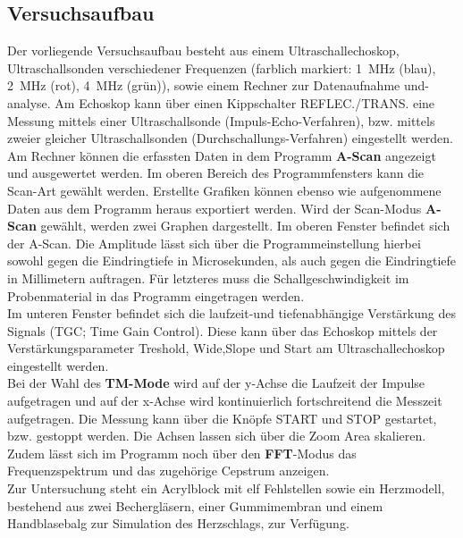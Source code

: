 \subsection{Versuchsaufbau}
\label{sec:Versuchsaufbau}
Der vorliegende Versuchsaufbau besteht aus einem Ultraschallechoskop, Ultraschallsonden verschiedener Frequenzen (farblich markiert: \SI{1}{\mega\Hz} (blau),  \SI{2}{\mega\Hz} (rot),  \SI{4}{\mega\Hz} (grün)), sowie einem Rechner zur Datenaufnahme und-analyse.
Am Echoskop kann über einen Kippschalter REFLEC./TRANS. eine Messung mittels einer Ultraschallsonde (Impuls-Echo-Verfahren), bzw. mittels zweier gleicher Ultraschallsonden (Durchschallungs-Verfahren) eingestellt werden.\\
Am Rechner können die erfassten Daten in dem Programm \textbf{A-Scan} angezeigt und ausgewertet werden.
Im oberen Bereich des Programmfensters kann die Scan-Art gewählt werden.
Erstellte Grafiken können ebenso wie aufgenommene Daten aus dem Programm heraus exportiert werden.
Wird der Scan-Modus \textbf{A-Scan} gewählt, werden zwei Graphen dargestellt. Im oberen Fenster befindet sich der A-Scan. Die Amplitude lässt sich über die Programmeinstellung hierbei sowohl gegen die Eindringtiefe in Microsekunden, als auch gegen die Eindringtiefe in Millimetern auftragen. Für letzteres muss die Schallgeschwindigkeit im Probenmaterial in das Programm eingetragen werden.\\
Im unteren Fenster befindet sich die laufzeit-und tiefenabhängige Verstärkung des Signals (TGC; Time Gain Control). Diese kann über das Echoskop mittels der Verstärkungsparameter Treshold, Wide,Slope und Start am Ultraschallechoskop eingestellt werden.\\
Bei der Wahl des \textbf{TM-Mode} wird auf der y-Achse die Laufzeit der Impulse aufgetragen und auf der x-Achse wird kontinuierlich fortschreitend die Messzeit aufgetragen.
Die Messung kann über die Knöpfe START und STOP gestartet, bzw. gestoppt werden.
Die Achsen lassen sich über die Zoom Area skalieren.
Zudem lässt sich im Programm noch über den \textbf{FFT}-Modus das Frequenzspektrum und das zugehörige Cepstrum anzeigen.\\
Zur Untersuchung steht ein Acrylblock mit elf Fehlstellen sowie ein Herzmodell, bestehend aus zwei Bechergläsern, einer Gummimembran und einem Handblasebalg zur Simulation des Herzschlags, zur Verfügung.
